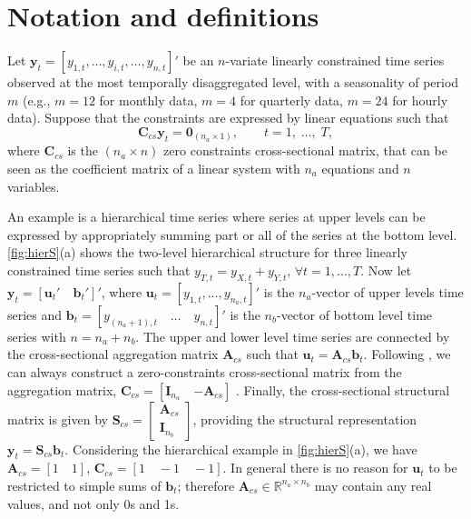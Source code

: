 \documentclass[12pt]{article}
\newcommand{\bvet}{\bm{b}}
\newcommand{\uvet}{\bm{u}}
\newcommand{\yvet}{\bm{y}}
\newcommand{\Avet}{\bm{A}}
\newcommand{\Cvet}{\bm{C}}
\newcommand{\Ivet}{\bm{I}}
\newcommand{\Svet}{\bm{S}}
\newcommand{\Zerovet}{\bm{0}}
\theoremstyle{definition}
\begin{document}
\section{Notation and definitions}\label{sec:not}

Let $\yvet_t = [y_{1,t},\dots,y_{i,t},\dots,y_{n,t}]'$ be an $n$-variate linearly constrained time series observed at the most temporally disaggregated level, with a seasonality of period $m$ (e.g., $m = 12$ for monthly data, $m = 4$ for quarterly data, $m = 24$ for hourly data). Suppose that the constraints are expressed by linear equations such that \citep{difonzo2023}
\begin{equation}
	\label{eq:cs_con}
	\Cvet_{cs}\yvet_t = \Zerovet_{(n_a \times 1)}, \qquad t = 1, \;\dots, \;T,
\end{equation}
where $\Cvet_{cs}$ is the $(n_a \times n)$ zero constraints cross-sectional matrix, that can be seen as the coefficient matrix of a linear system with $n_a$ equations and $n$ variables.



An example is a hierarchical time series where series at upper levels can be expressed by appropriately summing part or all of the series at the bottom level. \autoref{fig:hierS}(a) shows the two-level hierarchical structure for three linearly constrained time series such that $y_{T,t} = y_{X,t} + y_{Y,t}$, $\forall t = 1,...,T$. Now let $\yvet_t = \left[\uvet_t' \quad \bvet_t'\right]'$, where $\uvet_t = [y_{1,t}, \dots, y_{n_a,t}]'$ is the $n_a$-vector of upper levels time series and $\bvet_t = \left[y_{(n_a+1),t}\quad \dots \quad y_{n,t}\right]'$ is the $n_b$-vector of bottom level time series with $n = n_a+n_b$. The upper and lower level time series are connected by the cross-sectional aggregation matrix $\Avet_{cs}$ such that $\uvet_t = \Avet_{cs}\bvet_t$. Following \cite{giro2022}, we can always construct a zero-constraints cross-sectional matrix from the aggregation matrix, $\Cvet_{cs}=\left[\Ivet_{n_a} \quad {-\Avet_{cs}}\right]$ . Finally, the cross-sectional structural matrix is given by $\Svet_{cs} = \left[\begin{array}{c}
	\Avet_{cs}\\[-0.25cm]
	\Ivet_{n_b}
\end{array}\right]$, providing the structural representation \citep{hyndman2011} $\yvet_t = \Svet_{cs} \bvet_t$. Considering the hierarchical example in \autoref{fig:hierS}(a), we have $\Avet_{cs} = \left[ 1 \quad 1 \right]$, $\Cvet_{cs} = \left[ 1 \quad -1\quad -1 \right]$. In general there is no reason for $\uvet_t$ to be restricted to simple sums of $\bvet_t$; therefore $\Avet_{cs} \in \mathbb{R}^{n_a\times n_b}$ may contain any real values, and not only 0s and 1s.
\end{document}
